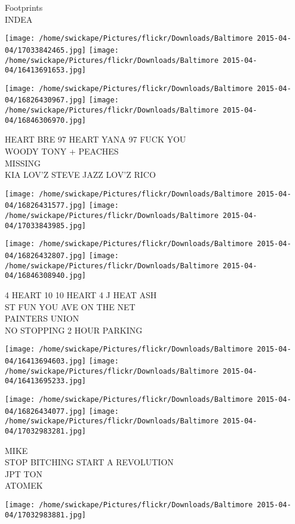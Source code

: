 \documentclass[10pt,letterpaper]{article}
\begin{document}
Footprints\\
INDEA
\pagebreak

\texttt{[image: /home/swickape/Pictures/flickr/Downloads/Baltimore 2015-04-04/17033842465.jpg]}
\texttt{[image: /home/swickape/Pictures/flickr/Downloads/Baltimore 2015-04-04/16413691653.jpg]}

\texttt{[image: /home/swickape/Pictures/flickr/Downloads/Baltimore 2015-04-04/16826430967.jpg]}
\texttt{[image: /home/swickape/Pictures/flickr/Downloads/Baltimore 2015-04-04/16846306970.jpg]}

HEART BRE 97 HEART YANA 97 FUCK YOU\\
WOODY TONY + PEACHES\\
MISSING\\
KIA LOV'Z STEVE JAZZ LOV'Z RICO
\pagebreak

\texttt{[image: /home/swickape/Pictures/flickr/Downloads/Baltimore 2015-04-04/16826431577.jpg]}
\texttt{[image: /home/swickape/Pictures/flickr/Downloads/Baltimore 2015-04-04/17033843985.jpg]}

\texttt{[image: /home/swickape/Pictures/flickr/Downloads/Baltimore 2015-04-04/16826432807.jpg]}
\texttt{[image: /home/swickape/Pictures/flickr/Downloads/Baltimore 2015-04-04/16846308940.jpg]}

4 HEART 10 10 HEART 4 J HEAT ASH\\
ST FUN YOU AVE ON THE NET\\
PAINTERS UNION\\
NO STOPPING 2 HOUR PARKING
\pagebreak

\texttt{[image: /home/swickape/Pictures/flickr/Downloads/Baltimore 2015-04-04/16413694603.jpg]}
\texttt{[image: /home/swickape/Pictures/flickr/Downloads/Baltimore 2015-04-04/16413695233.jpg]}

\texttt{[image: /home/swickape/Pictures/flickr/Downloads/Baltimore 2015-04-04/16826434077.jpg]}
\texttt{[image: /home/swickape/Pictures/flickr/Downloads/Baltimore 2015-04-04/17032983281.jpg]}

MIKE\\
STOP BITCHING START A REVOLUTION\\
JPT TON\\
ATOMEK
\pagebreak

\texttt{[image: /home/swickape/Pictures/flickr/Downloads/Baltimore 2015-04-04/17032983881.jpg]}
\end{document}
